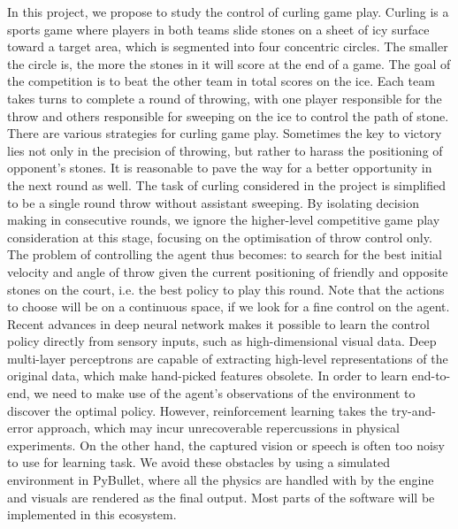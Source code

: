 \documentclass[oneside,11pt,a4paper]{article}
\begin{document}
\newline
\newline
\noindent
In this project, we propose to study the control of curling game play. Curling is a sports game where players in both teams slide stones on a sheet of icy surface toward a target area, which is segmented into four concentric circles. The smaller the circle is, the more the stones in it will score at the end of a game. The goal of the competition is to beat the other team in total scores on the ice. Each team takes turns to complete a round of throwing, with one player responsible for the throw and others responsible for sweeping on the ice to control the path of stone. There are various strategies for curling game play. Sometimes the key to victory lies not only in the precision of throwing, but rather to harass the positioning of opponent's stones. It is reasonable to pave the way for a better opportunity in the next round as well.
\newline
\newline
\noindent
The task of curling considered in the project is simplified to be a single round throw without assistant sweeping. By isolating decision making in consecutive rounds, we ignore the higher-level competitive game play consideration at this stage, focusing on the optimisation of throw control only. The problem of controlling the agent thus becomes: to search for the best initial velocity and angle of throw given the current positioning of friendly and opposite stones on the court, i.e. the best policy to play this round. Note that the actions to choose will be on a continuous space, if we look for a fine control on the agent.
\newline
\newline
\noindent
Recent advances in deep neural network makes it possible to learn the control policy directly from sensory inputs, such as high-dimensional visual data. Deep multi-layer perceptrons are capable of extracting high-level representations of the original data, which make hand-picked features obsolete. In order to learn end-to-end, we need to make use of the agent's observations of the environment to discover the optimal policy. However, reinforcement learning takes the try-and-error approach, which may incur unrecoverable repercussions in physical experiments. On the other hand, the captured vision or speech is often too noisy to use for learning task. We avoid these obstacles by using a simulated environment in PyBullet, where all the physics are handled with by the engine and visuals are rendered as the final output. Most parts of the software will be implemented in this ecosystem.
\end{document}

